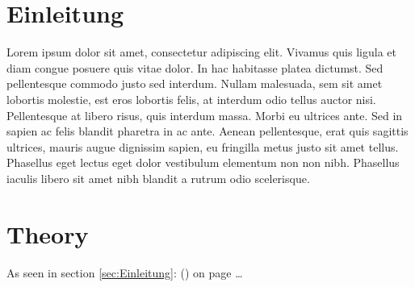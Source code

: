 \documentclass[10pt, a4paper]{article}
\begin{document}
\section{Einleitung \label{sec:Einleitung}}

Lorem ipsum dolor sit amet, consectetur adipiscing elit. Vivamus quis ligula et diam congue posuere quis vitae dolor. In hac habitasse platea dictumst. Sed pellentesque commodo justo sed interdum. Nullam malesuada, sem sit amet lobortis molestie, est eros lobortis felis, at interdum odio tellus auctor nisi. Pellentesque at libero risus, quis interdum massa. Morbi eu ultrices ante. Sed in sapien ac felis blandit pharetra in ac ante. Aenean pellentesque, erat quis sagittis ultrices, mauris augue dignissim sapien, eu fringilla metus justo sit amet tellus. Phasellus eget lectus eget dolor vestibulum elementum non non nibh. Phasellus iaculis libero sit amet nibh blandit a rutrum odio scelerisque.

\newpage

\section{Theory \label{sec:Theory}}
As seen in section \ref{sec:Einleitung}: () on page \pageref{sec:Einleitung}\ldots
\end{document}
